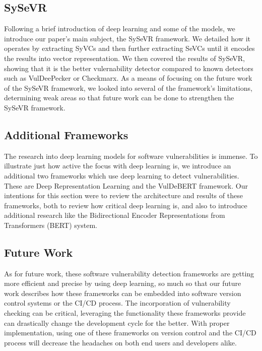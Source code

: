 \documentclass[12pt,twocolumn,letterpaper]{article}
\begin{document}
\subsection{SySeVR}
Following a brief introduction of deep learning and some of the models, we introduce our paper's main subject, the SySeVR framework.
We detailed how it operates by extracting SyVCs and then further extracting SeVCs until it encodes the results into vector representation. We then covered the
results of SySeVR, showing that it is the better vulernability detector compared to known detectors such as VulDeePecker or Checkmarx. As a means of focusing on the future work of the
SySeVR framework, we looked into several of the framework's limitations, determining weak areas so that future work can be done to strengthen the SySeVR framework.
\subsection{Additional Frameworks}
The research into deep learning models for software vulnerabilities is immense. To illustrate just how active the focus with deep learning is, we
introduce an additional two frameworks which use deep learning to detect vulnerabilities. These are Deep Representation Learning and the VulDeBERT framework. Our intentions for this section
were to review the architecture and results of these frameworks, both to review how critical deep learning is, and also to introduce additional research like the Bidirectional Encoder Representations from Transformers (BERT) system.
\subsection{Future Work}
As for future work, these software vulnerability detection frameworks are getting more efficient and precise by using deep learning, so much so
that our future work describes how these frameworks can be embedded into software version control systems or the CI/CD process. The incorporation of vulnerability checking can be critical, leveraging the functionality
these frameworks provide can drastically change the development cycle for the better. With proper implementation, using one of these frameworks on version control and the CI/CD process will decrease
the headaches on both end users and developers alike.

{\small


}
\end{document}
